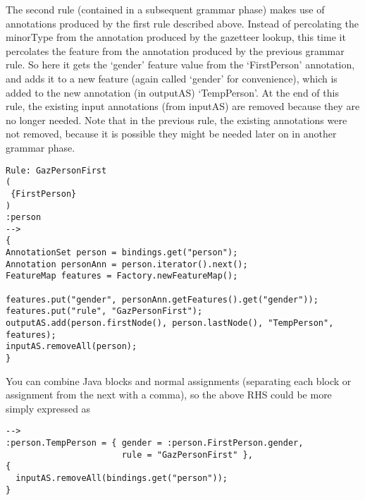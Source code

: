 The second rule (contained in a subsequent grammar phase) makes use of
annotations produced by the first rule described above. Instead of
percolating the minorType from the annotation produced by the
gazetteer lookup, this time it percolates the feature from the
annotation produced by the previous grammar rule. So here it gets the
`gender' feature value from the `FirstPerson' annotation, and adds it to
a new feature (again called `gender' for convenience), which is
added to the new annotation (in outputAS) `TempPerson'. At the end of this rule,
the existing input annotations (from inputAS) are removed because they are no longer
needed. Note that in the previous rule, the existing annotations were
not removed, because it is possible they might be needed later on in
another grammar phase.


\begin{small}
\begin{verbatim}
Rule: GazPersonFirst
(
 {FirstPerson}
)
:person
-->
{
AnnotationSet person = bindings.get("person");
Annotation personAnn = person.iterator().next();
FeatureMap features = Factory.newFeatureMap();

features.put("gender", personAnn.getFeatures().get("gender"));
features.put("rule", "GazPersonFirst");
outputAS.add(person.firstNode(), person.lastNode(), "TempPerson",
features);
inputAS.removeAll(person);
}
\end{verbatim}
\end{small}

You can combine Java blocks and normal assignments (separating each block or
assignment from the next with a comma), so the above RHS could be more
simply expressed as

\begin{small}
\begin{verbatim}
-->
:person.TempPerson = { gender = :person.FirstPerson.gender,
                       rule = "GazPersonFirst" },
{
  inputAS.removeAll(bindings.get("person"));
}
\end{verbatim}
\end{small}


